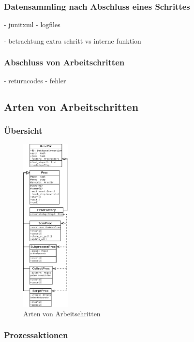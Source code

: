 \subsubsection{Datensammling nach Abschluss eines Schrittes}

- junitxml
- logfiles

- betrachtung extra schritt vs interne funktion

\subsubsection{Abschluss von Arbeitschritten}

- returncodes
- fehler

\subsection{Arten von Arbeitschritten}

\subsubsection{\"Ubersicht}

\begin{figure}[h!]
  \centering
  \label{fig:klassen-arten-arbeitsschritt}
  \includegraphics[height=3.5in]{imageinput/klassen-arten-arbeitsschritt.png}
  \caption{Arten von Arbeitschritten}
\end{figure}


\FloatBarrier
\subsubsection{Prozessaktionen}

